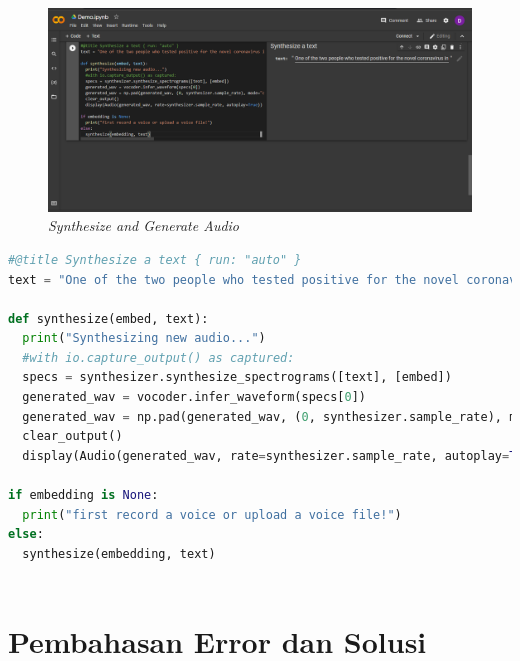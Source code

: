 \begin{enumerate}
\begin{figure}[H]
    \centering
    \includegraphics[scale=0.3]{figures/tutor6}
    \caption{\textit{Synthesize and Generate Audio}}
    \label{tutor6}
\end{figure}

\begin{lstlisting}[language=Python, caption=Synthesize dan Generate Audio Output]
#@title Synthesize a text { run: "auto" }
text = "One of the two people who tested positive for the novel coronavirus in the United Kingdom is a student at the University of York in northern England." #@param {type:"string"}
  
def synthesize(embed, text):
  print("Synthesizing new audio...")
  #with io.capture_output() as captured:
  specs = synthesizer.synthesize_spectrograms([text], [embed])
  generated_wav = vocoder.infer_waveform(specs[0])
  generated_wav = np.pad(generated_wav, (0, synthesizer.sample_rate), mode="constant")
  clear_output()
  display(Audio(generated_wav, rate=synthesizer.sample_rate, autoplay=True))

if embedding is None:
  print("first record a voice or upload a voice file!")
else:
  synthesize(embedding, text)
    
\end{lstlisting}
\end{enumerate}

\section{Pembahasan Error dan Solusi}